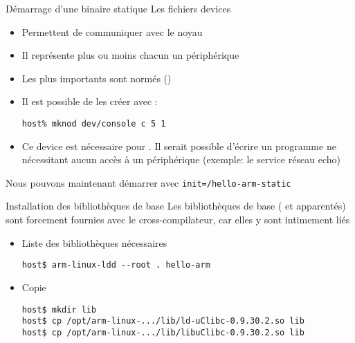\begin{frame}[fragile=singleslide]{Démarrage d'une binaire statique}
  Les fichiers devices
  \begin{itemize}
  \item Permettent de communiquer avec le noyau
  \item Il représente plus ou moins chacun un périphérique
  \item Les plus importants sont normés ()
  \item Il est possible de les créer avec :
    \begin{lstlisting}
host% mknod dev/console c 5 1
    \end{lstlisting}
  \item  Ce  device  est  nécessaire  pour  .   Il  serait
    possible  d'écrire un programme  ne nécessitant  aucun accès  à un
    périphérique (exemple: le service réseau echo)
  \end{itemize}
  Nous pouvons maintenant démarrer avec \verb+init=/hello-arm-static+
\end{frame}

\begin{frame}[fragile=singleslide]{Installation des bibliothèques de base}
  Les bibliothèques de base  ( et apparentés) sont forcement
  fournies avec le cross-compilateur, car elles y sont intimement liés
  \begin{itemize}
  \item Liste des bibliothèques nécessaires
    \begin{lstlisting}
host$ arm-linux-ldd --root . hello-arm
    \end{lstlisting}
    \item Copie
    \begin{lstlisting}
host$ mkdir lib
host$ cp /opt/arm-linux-.../lib/ld-uClibc-0.9.30.2.so lib
host$ cp /opt/arm-linux-.../lib/libuClibc-0.9.30.2.so lib
    \end{lstlisting}
  \end{itemize}
\end{frame}

